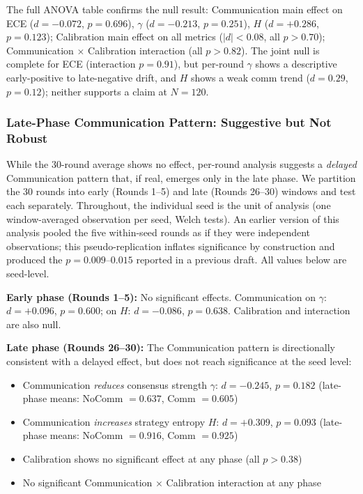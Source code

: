 \documentclass[11pt]{article}
\theoremstyle{definition}
\theoremstyle{remark}
\begin{document}
The full ANOVA table confirms the null result: Communication main effect on ECE ($d{=}-0.072$, $p{=}0.696$), $\gamma$ ($d{=}-0.213$, $p{=}0.251$), $H$ ($d{=}+0.286$, $p{=}0.123$); Calibration main effect on all metrics ($|d| < 0.08$, all $p > 0.70$); Communication $\times$ Calibration interaction (all $p > 0.82$). The joint null is complete for ECE (interaction $p=0.91$), but per-round $\gamma$ shows a descriptive early-positive to late-negative drift, and $H$ shows a weak comm trend ($d=0.29$, $p=0.12$); neither supports a claim at $N=120$.

\subsubsection{Late-Phase Communication Pattern: Suggestive but Not Robust}

While the 30-round average shows no effect, per-round analysis suggests a \textit{delayed} Communication pattern that, if real, emerges only in the late phase. We partition the 30 rounds into early (Rounds 1--5) and late (Rounds 26--30) windows and test each separately. Throughout, the individual seed is the unit of analysis (one window-averaged observation per seed, Welch tests). An earlier version of this analysis pooled the five within-seed rounds as if they were independent observations; this pseudo-replication inflates significance by construction and produced the $p {=} 0.009$--$0.015$ reported in a previous draft. All values below are seed-level.

\textbf{Early phase (Rounds 1--5):} No significant effects. Communication on $\gamma$: $d{=}+0.096$, $p{=}0.600$; on $H$: $d{=}-0.086$, $p{=}0.638$. Calibration and interaction are also null.

\textbf{Late phase (Rounds 26--30):} The Communication pattern is directionally consistent with a delayed effect, but does not reach significance at the seed level:

\begin{itemize}[leftmargin=*,nosep]
    \item Communication \textit{reduces} consensus strength $\gamma$: $d{=}-0.245$, $p{=}0.182$ (late-phase means: NoComm $=0.637$, Comm $=0.605$)
    \item Communication \textit{increases} strategy entropy $H$: $d{=}+0.309$, $p{=}0.093$ (late-phase means: NoComm $=0.916$, Comm $=0.925$)
    \item Calibration shows no significant effect at any phase (all $p > 0.38$)
    \item No significant Communication $\times$ Calibration interaction at any phase
\end{itemize}
\end{document}
